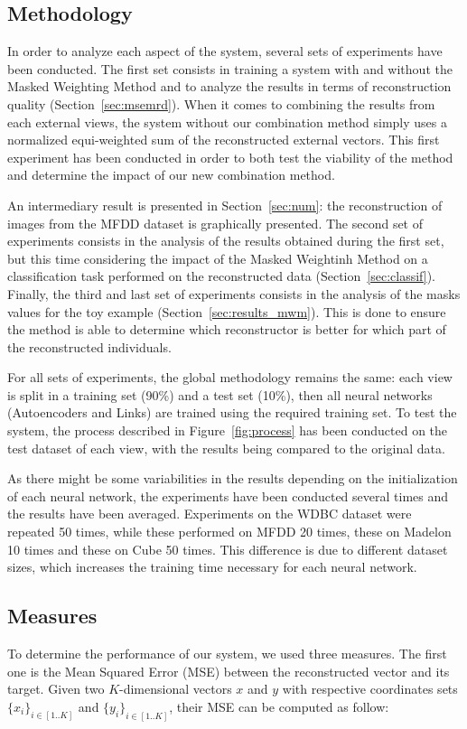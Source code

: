 	\subsection{Methodology}
\label{sec:methodo}
In order to analyze each aspect of the system, several sets of experiments have been conducted.	The first set consists in training a system with and without the Masked Weighting Method and to analyze the results in terms of reconstruction quality (Section~\ref{sec:msemrd}). When it comes to combining the results from each external views, the system without our combination method simply uses a normalized equi-weighted sum of the reconstructed external vectors. This first experiment has been conducted in order to both test the viability of the method and determine the impact of our new combination method.\@

An intermediary result is presented in Section~\ref{sec:num}: the reconstruction of images from the MFDD dataset is graphically presented. The second set of experiments consists in the analysis of the results obtained during the first set, but this time considering the impact of the Masked Weightinh Method on a classification task performed on the reconstructed data (Section~\ref{sec:classif}). Finally, the third and last set of experiments consists in the analysis of the masks values for the toy example (Section~\ref{sec:results_mwm}). This is done to ensure the method is able to determine which reconstructor is better for which part of the reconstructed individuals.
	
For all sets of experiments, the global methodology remains the same: each view is split in a training set (90\%) and a test set (10\%), then all neural networks (Autoencoders and Links) are trained using the required training set. To test the system, the process described in Figure~\ref{fig:process} has been conducted on the test dataset of each view, with the results being compared to the original data.
	
As there might be some variabilities in the results depending on the initialization of each neural network, the experiments have been conducted several times and the results have been averaged. Experiments on the WDBC dataset were repeated 50 times, while these performed on MFDD 20 times, these on Madelon 10 times and these on Cube 50 times. This difference is due to different dataset sizes, which increases the training time necessary for each neural network.
	
	\subsection{Measures}
\label{sec:measures}
To determine the performance of our system, we used three measures. The first one is the Mean Squared Error (MSE) between the reconstructed vector and its target. Given two $K$-dimensional vectors $x$ and $y$ with respective coordinates sets ${\{x_i\}}_{i \in [1..K]}$ and ${\{y_i\}}_{i \in [1..K]}$, their MSE can be computed as follow:
	
